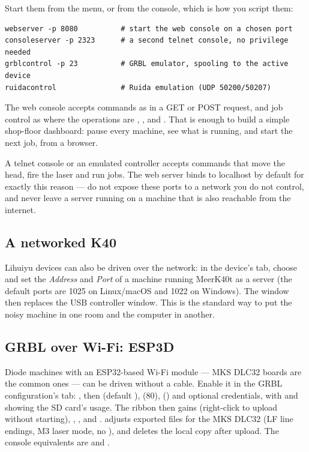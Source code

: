 \noindent Start them from the menu, or from the console, which is how you script
them:

\begin{lstlisting}[style=konsole]
webserver -p 8080          # start the web console on a chosen port
consoleserver -p 2323      # a second telnet console, no privilege needed
grblcontrol -p 23          # GRBL emulator, spooling to the active device
ruidacontrol               # Ruida emulation (UDP 50200/50207)
\end{lstlisting}

\noindent The web console accepts commands as  in a GET or
POST request, and job control as  where the
operations are , ,  and
. That is enough to build a simple shop-floor dashboard:
pause every machine, see what is running, and start the next job, from a browser.

\begin{warnbox}
A telnet console or an emulated controller accepts commands that move the head,
fire the laser and run jobs. The web server binds to localhost by default for
exactly this reason --- do not expose these ports to a network you do not
control, and never leave a server running on a machine that is also reachable
from the internet.
\end{warnbox}

\subsection*{A networked K40}

Lihuiyu devices can also be driven over the network: in the device's
 tab, choose  and set the \emph{Address} and
\emph{Port} of a machine running MeerK40t as a server (the default ports are 1025
on Linux/macOS and 1022 on Windows). The  window then
replaces the USB controller window. This is the standard way to put the noisy
machine in one room and the computer in another.

\subsection*{GRBL over Wi-Fi: ESP3D}

Diode machines with an ESP32-based Wi-Fi module --- MKS DLC32 boards are the
common ones --- can be driven without a cable. Enable it in the GRBL
configuration's  tab: , then
 (default ),  (80),
 (\file{/}) and optional credentials, with
 and  showing the SD card's usage. The
ribbon then gains  (right-click to upload without
starting), , ,  and
.  adjusts exported files
for the MKS DLC32 (LF line endings, M3 laser mode, no ), and
 deletes the local copy after upload. The console
equivalents are  and
.

